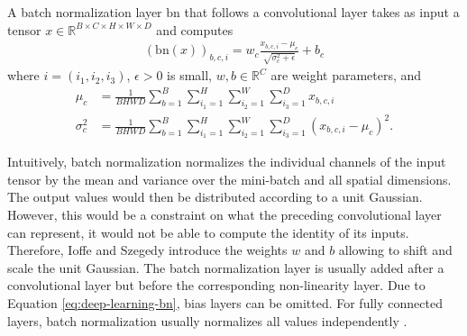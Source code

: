 \begin{remark}
  A batch normalization layer $\text{bn}$ that follows a convolutional layer
  takes as input a tensor $x \in \mathbb{R}^{B \times C \times H \times W \times D}$
  and computes
  \begin{align}
    (\text{bn}(x))_{b,c,i} = w_c \frac{x_{b,c,i} - \mu_c}{\sqrt{\sigma^2_c + \epsilon}} + b_c
    \label{eq:deep-learning-bn}
  \end{align}
  where $i = (i_1, i_2, i_3)$, $\epsilon > 0$ is small, $w, b \in \mathbb{R}^{C}$ 
  are weight parameters, and
  \begin{align}
    \mu_c &= \frac{1}{BHWD}\sum_{b = 1}^B\sum_{i_1 = 1}^H\sum_{i_2 = 1}^W\sum_{i_3 = 1}^D x_{b, c, i}
    \\%
    \sigma^2_c &= \frac{1}{BHWD}\sum_{b = 1}^B\sum_{i_1 = 1}^H\sum_{i_2 = 1}^W\sum_{i_3 = 1}^D (x_{b, c, i} - \mu_c)^2.
  \end{align}
\end{remark}

Intuitively, batch normalization normalizes the individual channels of the input
tensor by the mean and variance over the mini-batch and all spatial dimensions.
The output values would then be distributed
according to a unit Gaussian. However, this would be a constraint on what
the preceding convolutional layer can represent, \eg it would not be able
to compute the identity of its inputs. Therefore, Ioffe and Szegedy \cite{IoffeSzegedy:2015}
introduce the weights $w$ and $b$ allowing to shift and scale the unit Gaussian.
The batch normalization layer is usually added
after a convolutional layer but before the corresponding non-linearity layer.
Due to Equation \eqref{eq:deep-learning-bn}, bias layers can be omitted.
For fully connected layers, batch normalization usually normalizes all values
independently \cite{IoffeSzegedy:2015}.

    


